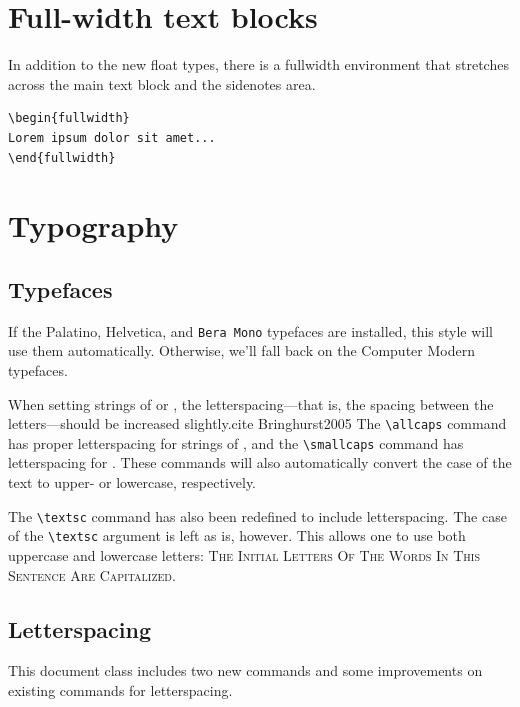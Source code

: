 \documentclass{tufte-handout}
\newcommand{\docenv}[1]{\textsf{#1}}%
\begin{document}
\section{Full-width text blocks}

In addition to the new float types, there is a \docenv{fullwidth}
environment that stretches across the main text block and the sidenotes
area.

\begin{Verbatim}
\begin{fullwidth}
Lorem ipsum dolor sit amet...
\end{fullwidth}
\end{Verbatim}

\begin{fullwidth}
\small\itshape\lipsum[1]
\end{fullwidth}

\section{Typography}\label{sec:typography}

\subsection{Typefaces}\label{sec:typefaces}
If the Palatino, \textsf{Helvetica}, and \texttt{Bera Mono} typefaces are installed, this style
will use them automatically.  Otherwise, we'll fall back on the Computer Modern
typefaces.

When setting strings of  or , the
letter\-spacing---that is, the spacing between the letters---should be
increased slightly.cite Bringhurst2005  The \Verb|\allcaps| command has proper letterspacing for
strings of , and the \Verb|\smallcaps| command
has letterspacing for . These commands
will also automatically convert the case of the text to upper- or
lowercase, respectively.

The \Verb|\textsc| command has also been redefined to include
letterspacing.  The case of the \Verb|\textsc| argument is left as is,
however.  This allows one to use both uppercase and lowercase letters:
\textsc{The Initial Letters Of The Words In This Sentence Are Capitalized.}

\subsection{Letterspacing}\label{sec:letterspacing}
This document class includes two new commands and some improvements on
existing commands for letterspacing.
\end{document}
